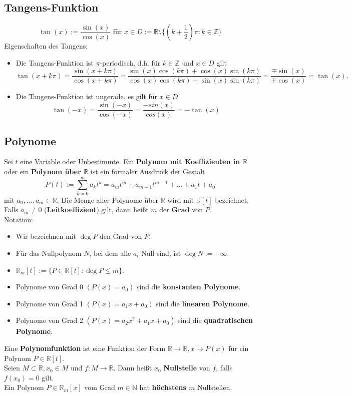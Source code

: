 \documentclass[12pt]{article}
\begin{document}
\subsection{Tangens-Funktion}
\[\tan(x) := \frac{\sin(x)}{\cos(x)} \text{ für } x \in D := \mathbb{R} \setminus \{(k+\frac{1}{2})\pi : k \in \mathbb{Z}\}\]
Eigenschaften des Tangens:
\begin{itemize}
    \item Die Tangens-Funktion ist $\pi$-periodisch, d.h. für $k \in \mathbb{Z}$ und $x \in D$ gilt
    \[\tan(x + k\pi) = \frac{\sin(x + k\pi)}{\cos(x + k\pi)} = \frac{\sin(x) \cos(k\pi) + \cos(x) \sin(k\pi)}{\cos(x) \cos(k\pi) - \sin(x) \sin(k\pi)} = \frac{\mp \sin(x)}{\mp \cos(x)} = \tan(x).\]
    \item Die Tangens-Funktion ist ungerade, es gilt für $x \in D$
    \[\tan(-x) = \frac{\sin(-x)}{\cos(-x)} = \frac{-sin(x)}{cos(x)} = -\tan(x)\]
\end{itemize}
\subsection{Polynome}
Sei $t$ eine \underline{Variable} oder \underline{Unbestimmte}. Ein \textbf{Polynom mit Koeffizienten in $\mathbb{R}$} oder ein \textbf{Polynom über $\mathbb{R}$} ist ein formaler Ausdruck der Gestalt
\[P(t) := \sum_{k=0}^{m}a_k t^k = a_m t^m + a_{m-1} t^{m-1} + \ldots + a_1 t + a_0\]
mit $a_0, \dots, a_m \in \mathbb{R}$. Die Menge aller Polynome über $\mathbb{R}$ wird mit $\mathbb{R}[t]$ bezeichnet. Falls $a_m \neq 0$ (\textbf{Leitkoeffizient}) gilt, dann heißt $m$ der \textbf{Grad} von $P$. \\
\newline
Notation:
\begin{itemize}
    \item Wir bezeichnen mit $\deg P$ den Grad von $P$.
    \item Für das Nullpolynom $N$, bei dem alle $a_i$ Null sind, ist $\deg N := -\infty$.
    \item $\mathbb{R}_m[t] := \{ P \in \mathbb{R}[t] : \deg P \leq m \}$.
    \item Polynome von Grad 0 $(P(x) = a_0)$ sind die \textbf{konstanten Polynome}.
    \item Polynome von Grad 1 $(P(x) = a_1 x + a_0)$ sind die \textbf{linearen Polynome}.
    \item Polynome von Grad 2 $(P(x) = a_2 x^2 + a_1 x + a_0)$ sind die \textbf{quadratischen Polynome}.
\end{itemize}
Eine \textbf{Polynomfunktion} ist eine Funktion der Form $\mathbb{R} \to \mathbb{R}, x \mapsto P(x)$ für ein Polynom $P \in \mathbb{R}[t]$. \\
\newline
Seien $M \subset \mathbb{R}, x_0 \in M$ und $f: M \to \mathbb{R}$. Dann heißt $x_0$ \textbf{Nullstelle} von $f$, falls $f(x_0) = 0$ gilt. \\ 
Ein Polynom $P \in \mathbb{R}_m[x]$ vom Grad $m \in \mathbb{N}$ hat \textbf{höchstens $m$} Nullstellen.
\end{document}
